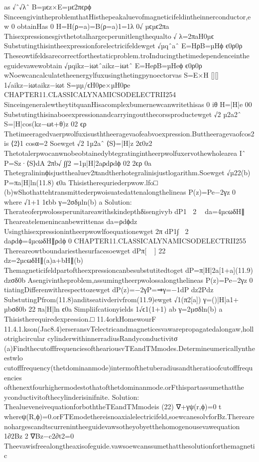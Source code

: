 {{{{{{{{{{{{{{{{as
√ˆ√λˆ
B=µϵz×E=µϵ2πϵρϕ
SinceengivintheproblemthatHisthepeakaluevofmagneticifeldintheinnerconductor,ew
0
obtainHas
0
H=H(ρ=a)=B(ρ=a)1=1λ
0√
µϵµϵ2πa
Thisexpressionesgivthetotalhargecperunitlengthequalto
√
λ=2πaH0µϵ
Substutingthisintheexpressionforelectricifeldewget
√µqˆaˆ
E=HρB=µHϕ
ϵ0ρ0ρ
Theseowtifeldsarecorrectforthestaticproblem.troInducingthetimedependenceinthe
eguidevawewobtain
√µqikz−iωtˆaikz−iωtˆ
E=HeρB=µHeϕ
ϵ0ρ0ρ
wNoewcancalculatetheenergylfuxusingthetingpynoectorvas
S=E×H
[][]
1√aikz−iωtaikz−iωt
S=µµ/ϵH0ρe×µH0ρe
CHAPTER11.CLASSICALYNAMICSODELECTRII254
SinceingeneralewtheytitquanHisacomplexbumernewcanwritethisas
0
iθ
H=|H|e
00
Substutingthisinaboeexpressionandcarryingoutthecorssproductewget
√2
µ2a2ˆ
S=|H|cos(kz−ωt+θ)z
02
ϵρ
Thetimeeragedvaerpwolfuxisusththeeragevaofeabvoexpression.Buttheeragevaofcos2is
⟨2⟩1
cosα=2
Soewget
√2
1µ2aˆ
⟨S⟩=|H|z
2ϵ0z2
Thetotalerpwocanwnobeobtainedybtegratingintheerpwolfuxervothewholearea
Iˆ
P=Sz·⟨S⟩dA
2πb√
∫∫2
=1µ|H|2aρdρdϕ
02
2ϵρ
0a
Thetegralininϕisjustthealuev2πandtherhotegralinisjustlogarithm.Soewget
√µ22(b)
P=πa|H|ln(11.8)
ϵ0a
Thisistherequriederpwow.lfo□
(b)wShothattehtransmittederpwoisuatedattenalongthelineas
P(z)=Pe−2γz
0
where
√1+1
1ϵbb
γ=2σδµln(b)
a
Solution:
Therateoferpwolossperunitareawithskindepthδisengivyb
dP1
2

da=4µcωδH∥
Theareatelemenincanbewrittenas
da=ρdϕdz
Usingthisexpressionintheerpwowlfoequationewget
2π
dP1∫
2

daρdϕ=4µcωδH∥ρdϕ
0
CHAPTER11.CLASSICALYNAMICSODELECTRII255
Thereareowtboundariesthesurfacesoewget
dPπ[]
22

dz=2µcωδH∥(a)a+bH∥(b)
Themagneticifeldpartoftheexpressioncanbesubstutitedtoget
dP=π|H|2a[1+a](11.9)
dzσδ0b
Asengivintheproblem,assumingtheerpwolossalongthelineas
P(z)=Pe−2γz
0
tiatingDifferenwithrespecttozewget
dP(z)=−2γP=⇒γ=−1dP
dz2Pdz
SubstutingPfrom(11.8)anditseativderivfrom(11.9)ewget
√1(π2[a])
γ=()|H|a1+
µbσδ0b
22
πa|H|ln
ϵ0a
Simpliifcationyields
1√ϵ1(1+1)
ab
γ=2µσδln(b)
a
Thisistherequiredexpression.□
11.4orkHomewourF
11.4.1.kson(Jac8.4)erseransvTelectricandmagneticesvawarepropagatedalongaw,hollotrighcircular
cylinderwithinnerradiusRandyconductivitσ
(a)FindthecutofffrequenciesoftheariousvTEandTMmodes.Determineumericallyntheestwlo
cutofffrequency(thetdominanmode)intermofthetuberadiusandtheratioofcutofffrequencies
ofthenextfourhighermodestothatofthetdominanmode.orFthispartassumethatthe
yconductivitofthecylinderisinifnite.
Solution:
ThealueveneivequationforboththeTEandTMmodeis
(22)
∇+γψ(r,ϕ)=0
t
whereψ(R,ϕ)=0.orFTEmodethereisnoaxialelectricifeld,soewcanesolvforBz.Thereare
nohargescandtscurrenintheeguidevawsotheyobyetthehomogenousevawequation
1∂2Bz
2
∇Bz−c2∂t2=0
Theevawisfreealongtheaxisofeguide.vawsoewcanssumethatthesolutionforthemagnetic
}}}}}}}}}}}}}}}}
